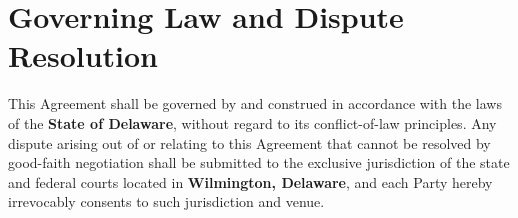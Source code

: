 \section{Governing Law and Dispute Resolution}

\noindent
This Agreement shall be governed by and construed in accordance with the laws
of the \textbf{State of Delaware}, without regard to its conflict-of-law
principles. Any dispute arising out of or relating to this Agreement that cannot
be resolved by good-faith negotiation shall be submitted to the exclusive
jurisdiction of the state and federal courts located in \textbf{Wilmington,
Delaware}, and each Party hereby irrevocably consents to such jurisdiction and
venue.
